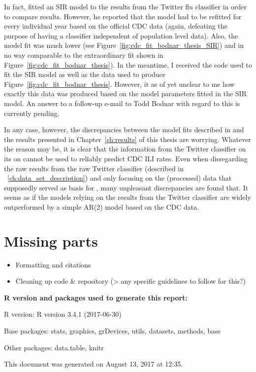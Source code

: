 \documentclass[11pt, a4paper,twoside]{report}\usepackage[]{graphicx}\usepackage[]{color}
\newcommand{\prog}[1]{\textsf{#1}}
\begin{document}
In fact, \citep{bodnar_data_2015} fitted an SIR model to the results from the Twitter flu classifier in order to compare results. However, he reported that the model had to be refitted for every individual year based on the official CDC data (again, defeating the purpose of having a classifier independent of population level data). Also, the model fit was much lower (see Figure~\ref{fig:cdc_fit_bodnar_thesis_SIR}) and in no way comparable to the extraordinary fit shown in Figure~\ref{fig:cdc_fit_bodnar_thesis}). In the meantime, I received the code used to fit the SIR model as well as the data used to produce Figure~\ref{fig:cdc_fit_bodnar_thesis}. However, it as of yet unclear to me how exactly this data was produced based on the model parameters fitted in the SIR model. An answer to a follow-up e-mail to Todd Bodnar with regard to this is currently pending.\newline

In any case, however, the discrepancies between the model fits described in \citep{bodnar_data_2015} and the results presented in Chapter~\ref{ch:results} of this thesis are worrying. Whatever the reason may be, it is clear that the information from the Twitter classifier on its on cannot be used to reliably predict CDC ILI rates. Even when disregarding the raw results from the raw Twitter classifier (described in ~\ref{ch:data_set_description}) and only focusing on the (processed) data that supposedly served as basis for \citep{bodnar_data_2015}, many unpleasant discrepancies are found that. It seems as if the models relying on the results from the Twitter classifier are widely outperformed by a simple AR(2) model based on the CDC data.

\section{Missing parts}

\begin{itemize}
\item Formatting and citations
\item Cleaning up code \& repository (> any specific guidelines to follow for this?)
\end{itemize}

\newpage



\newpage
{}


%

\vfill

\footnotesize

{\bf \prog{R} version and packages used to generate this report:}

\prog{R} version: \textsf{R version 3.4.1 (2017-06-30)}

Base packages: \textsf{stats, graphics, grDevices, utils, datasets, methods, base}

Other packages: \textsf{data.table, knitr}

This document was generated on August 13, 2017 at 12:35.
\end{document}
